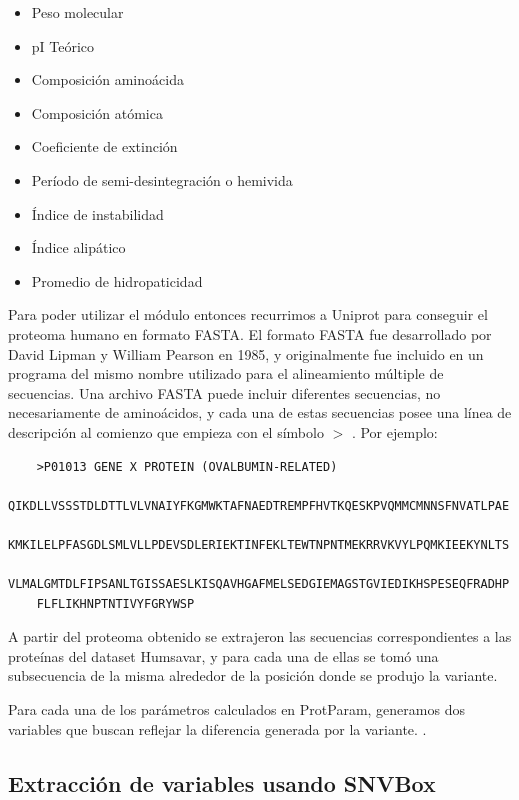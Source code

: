 \begin{itemize}
    \item Peso molecular
    \item pI Teórico
    \item Composición aminoácida
    \item Composición atómica
    \item Coeficiente de extinción
    \item Período de semi-desintegración o hemivida
    \item Índice de instabilidad
    \item Índice alipático
    \item Promedio de hidropaticidad
\end{itemize}

Para poder utilizar el módulo entonces recurrimos a Uniprot para conseguir el proteoma humano en formato FASTA. El formato FASTA fue desarrollado por David Lipman y William Pearson en 1985, y originalmente fue incluido en un programa del mismo nombre utilizado para el alineamiento múltiple de secuencias. Una archivo FASTA puede incluir diferentes secuencias, no necesariamente de aminoácidos, y cada una de estas secuencias posee una línea de descripción al comienzo que empieza con el símbolo $>$ \todo{[citar]}. Por ejemplo:

\begin{verbatim}
	>P01013 GENE X PROTEIN (OVALBUMIN-RELATED)
	QIKDLLVSSSTDLDTTLVLVNAIYFKGMWKTAFNAEDTREMPFHVTKQESKPVQMMCMNNSFNVATLPAE
	KMKILELPFASGDLSMLVLLPDEVSDLERIEKTINFEKLTEWTNPNTMEKRRVKVYLPQMKIEEKYNLTS
	VLMALGMTDLFIPSANLTGISSAESLKISQAVHGAFMELSEDGIEMAGSTGVIEDIKHSPESEQFRADHP
	FLFLIKHNPTNTIVYFGRYWSP
\end{verbatim}


A partir del proteoma obtenido se extrajeron las secuencias correspondientes a las proteínas del dataset Humsavar, y para cada una de ellas se tomó una subsecuencia de la misma alrededor de la posición donde se produjo la variante.

\vspace{2mm}
\vspace{2mm}

Para cada una de los parámetros calculados en ProtParam, generamos dos variables que buscan reflejar la diferencia generada por la variante. .

\subsection{Extracción de variables usando SNVBox}

